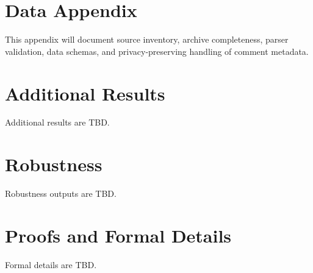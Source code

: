 \section{Data Appendix}\label{app:data}
This appendix will document source inventory, archive completeness, parser validation, data schemas, and privacy-preserving handling of comment metadata.

\section{Additional Results}\label{app:additional-results}
Additional results are TBD.

\section{Robustness}\label{app:robustness}
Robustness outputs are TBD.

\section{Proofs and Formal Details}\label{app:proofs}
Formal details are TBD.
